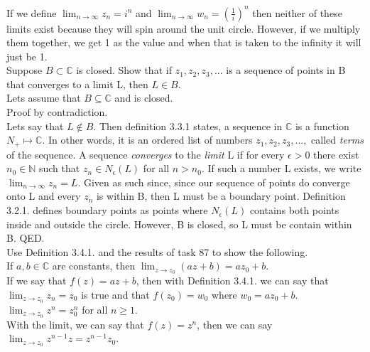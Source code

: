 \documentclass[12pt]{article}
\begin{document}
If we define $\lim_{n\to\infty} z_n = i^n$ and $\lim_{n\to\infty} w_n = (\frac{1}{i})^n$ then neither of these limits exist because they will spin around the unit circle.
However, if we multiply them together, we get 1 as the value and when that is taken to the infinity it will just be 1.\\


 Suppose $B \subset \mathbb{C}$ is closed. Show that if $z_1,z_2,z_3,...$ is a sequence of points in B that converges to a limit L, then $L \in B$.\\

Lets assume that $B \subseteq \mathbb{C}$ and is closed.\\

Proof by contradiction.\\
Lets say that $L \not\in B$.
Then definition 3.3.1 states, a sequence in $\mathbb{C}$ is a function $N_+ \mapsto \mathbb{C}$. In other words, it is an ordered list of numbers $z_1,z_2,z_3,...,$ called \textit{terms} of the sequence. 
A sequence \textit{converges} to the \textit{limit} L if for every $\epsilon > 0$ there exist $n_0 \in \mathbb{N}$ such that $z_n \in N_{\epsilon}(L)$ for all $n > n_0$. 
If such a number L exists, we write $\lim_{n\to\infty} z_n = L$.
Given as such since, since our sequence of points do converge onto L and every $z_n$ is within B, then L must be a boundary point.
Definition 3.2.1. defines boundary points as points where $N_{\epsilon}(L)$ contains both points inside and outside the circle.
However, B is closed, so L must be contain within B.
QED.\\


 Use Definition 3.4.1. and the results of task 87 to show the following.\\

 If $a,b \in \mathbb{C}$ are constants, then $\lim_{z \to z_0} (az+b) = az_0 + b$.\\

If we say that $f(z) = az + b$, then with Definition 3.4.1. we can say that $\lim_{z\to z_0} z_n = z_0$ is true and that $f(z_0) = w_0$ where $w_0 = az_0 + b$.\\

 $\lim_{z \to z_0} z^n = z^{n}_{0}$ for all $n \geq 1$.\\

With the limit, we can say that $f(z) = z^n$, then we can say $\lim_{z\to z_0} z^{n-1}z = z^{n-1}z_0$.
\end{document}
